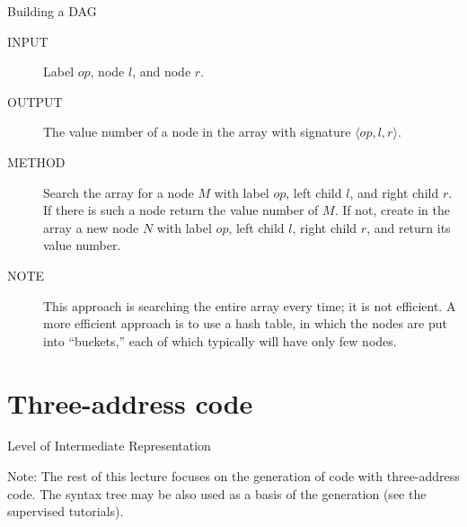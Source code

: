 \begin{bibunit}[apalike]
\begin{frame}[fragile]{Building a DAG}
	\begin{description}
	\item[INPUT] Label $op$, node $l$, and node $r$.
	\item[OUTPUT] The value number of a node in the array with signature $\langle op,l,r \rangle$.
	\vfill
	\item[METHOD] Search the array for a node $M$ with label $op$, left child $l$, and right child $r$. If there is such a node return the value number of $M$. If not, create in the array a new node $N$ with label $op$, left child $l$, right child $r$, and return its value number.
	\vfill
	\item[NOTE] This approach is searching the entire array every time; it is not efficient. A more efficient approach is to use a hash table, in which the nodes are put into ``buckets,'' each of which typically will have only few nodes.
	\end{description}
\end{frame}

\section{Three-address code}

\tableofcontentslide[sections={1-5},sectionstyle={show/shaded},subsectionstyle={show/show/hide},subsubsectionstyle={hide/hide/hide/hide}]

\begin{frame}{Level of Intermediate Representation}
	\vspace{2em}
	\vspace{2em}
	\begin{tiny}
		\alert{Note:} The rest of this lecture focuses on the generation of code with three-address code. The syntax tree may be also used as a basis of the generation (see the supervised tutorials).
	\end{tiny}
\end{frame}


\end{bibunit}
